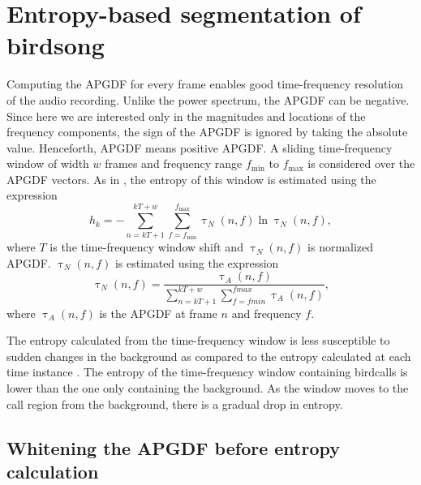 \documentclass[a4paper]{article}
\begin{document}
\section{Entropy-based segmentation of birdsong}

Computing the APGDF for every frame enables good time-frequency resolution of
the audio recording. Unlike the power spectrum, the APGDF can be negative.
Since here we are interested only in the magnitudes and locations of the
frequency components, the sign of the APGDF is ignored by taking the absolute
value. Henceforth, APGDF means positive APGDF.  A sliding time-frequency window
of width $w$ frames and frequency range $f_{\min}$ to $f_{\max}$ is considered over the
APGDF vectors. As in \cite{wang2013}, the entropy of this window is estimated
using the expression
\begin{equation}
\label{eq:2}
 h_{k}=-\sum_{n=kT+1}^{kT+w}\sum_{f=f_{\min}}^{f_{\max}} \uptau_N(n,f) \ln \uptau_N(n,f),
\end{equation}
where $T$ is the time-frequency window shift and $\uptau_N(n,f)$ is normalized
APGDF. $\uptau_N(n,f)$ is estimated using the expression 
\begin{equation}
\label{eq:3}
\uptau_N(n,f)=\frac {\uptau_A(n,f)}
{\sum_{n=kT+1}^{kT+w}\sum_{f=fmin}^{fmax} \uptau_A(n,f)},
\end{equation}
where $\uptau_A(n,f)$ is the APGDF at frame $n$ and frequency $f$.

The entropy calculated from the time-frequency window is less susceptible to sudden
changes in the background as compared to the entropy calculated at each time
instance \cite{wang2013}. The entropy of the time-frequency window containing
birdcalls is lower than the one only containing the background. As the
window moves to the call region from the background, there is a gradual drop in
entropy. 




 


\subsection{Whitening the APGDF before entropy calculation}
\end{document}
